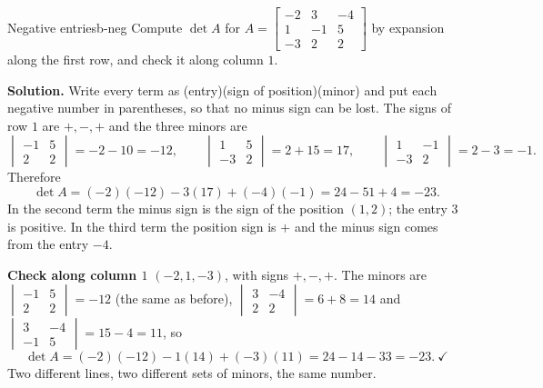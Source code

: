 \documentclass[11pt]{article}
\begin{document}
\begin{exmp}{Negative entries}{b-neg}
Compute $\det A$ for $A=\begin{bmatrix}-2&3&-4\\1&-1&5\\-3&2&2\end{bmatrix}$ by expansion along the first row, and check it along column $1$.

\textbf{Solution.} Write every term as (entry)(sign of position)(minor) and put each negative number in parentheses, so that no minus sign can be lost. The signs of row $1$ are $+,-,+$ and the three minors are
\[
\begin{vmatrix}-1&5\\2&2\end{vmatrix}=-2-10=-12,\qquad
\begin{vmatrix}1&5\\-3&2\end{vmatrix}=2+15=17,\qquad
\begin{vmatrix}1&-1\\-3&2\end{vmatrix}=2-3=-1.
\]
Therefore
\[
\det A=(-2)(-12)-3(17)+(-4)(-1)=24-51+4=-23.
\]
In the second term the minus sign is the sign of the position $(1,2)$; the entry $3$ is positive. In the third term the position sign is $+$ and the minus sign comes from the entry $-4$.

\textbf{Check along column $1$} $(-2,1,-3)$, with signs $+,-,+$. The minors are $\begin{vmatrix}-1&5\\2&2\end{vmatrix}=-12$ (the same as before), $\begin{vmatrix}3&-4\\2&2\end{vmatrix}=6+8=14$ and $\begin{vmatrix}3&-4\\-1&5\end{vmatrix}=15-4=11$, so
\[
\det A=(-2)(-12)-1(14)+(-3)(11)=24-14-33=-23.\ \checkmark
\]
Two different lines, two different sets of minors, the same number.
\end{exmp}
\end{document}
